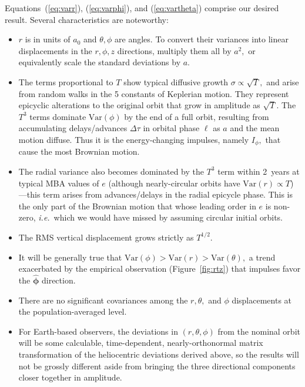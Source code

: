 \documentclass[linenumbers, onecolumn]{aastex631}
\newcommand{\ie}{\textit{i.e.\/}}
\newcommand{\phat}{\boldsymbol{\hat\phi}}
\newcommand{\Var}{\textrm{Var}}
\newcommand{\ma}{\ell}  %
\begin{document}
Equations~(\ref{eq:varr}), (\ref{eq:varphi}), and (\ref{eq:vartheta}) comprise our desired result.  Several characteristics are noteworthy:
\begin{itemize}
\item $r$ is in units of $a_0$ and $\theta, \phi$ are angles.  To convert their variances into linear displacements in the $r,\phi,z$ directions, multiply them all by $a^2,$ or equivalently scale the standard deviations by $a.$
\item The terms proportional to $T$ show typical diffusive growth
  $\sigma \propto \sqrt{T},$ and arise from random walks in the 5 constants of Keplerian motion.  They represent epicyclic alterations to the original orbit that grow in amplitude as $\sqrt{T}.$  The $T^3$ terms dominate $\Var(\phi)$ by the end of a full orbit, resulting from accumulating delays/advances $\Delta\tau$ in orbital phase $\ma$ as $a$ and the mean motion diffuse.  Thus it is the energy-changing impulses, namely $I_\phi,$ that cause the most Brownian motion.
\item The radial variance also becomes dominated by the $T^3$ term
  within 2~years at typical MBA values of $e$ (although
  nearly-circular orbits have $\Var(r)\propto T$)---this term arises from advances/delays in the radial epicycle phase.  This is the only part of the Brownian motion that whose leading order in $e$ is non-zero, \ie\ which we would have missed by assuming circular initial orbits.
\item The RMS vertical displacement grows strictly as $T^{1/2}.$
\item It will be generally true that $\Var(\phi) > \Var(r) > \Var(\theta),$ a trend exacerbated by the empirical observation (Figure~\ref{fig:rtz}) that impulses favor the $\phat$ direction.
\item There are no significant covariances among the $r,\theta,$ and $\phi$ displacements at the population-averaged level.
  \item For Earth-based observers, the deviations in $(r,\theta,\phi)$ from the nominal orbit will be some calculable, time-dependent, nearly-orthonormal matrix transformation of the heliocentric deviations derived above, so the results will not be grossly different aside from bringing the three directional components closer together in amplitude.
\end{itemize}
\end{document}
